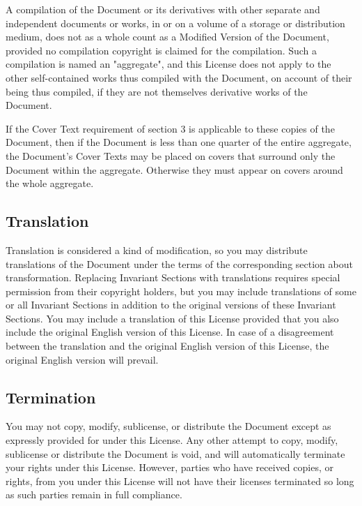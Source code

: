 	A compilation of the Document or its derivatives with other separate and independent documents or works, in or on a volume of a storage or distribution medium, does not as a whole count as a Modified Version of the Document, provided no compilation copyright is claimed for the compilation. Such a compilation is named an "aggregate", and this License does not apply to the other self-contained works thus compiled with the Document, on account of their being thus compiled, if they are not themselves derivative works of the Document. 

	If the Cover Text requirement of section 3 is applicable to these copies of the Document, then if the Document is less than one quarter of the entire aggregate, the Document's Cover Texts may be placed on covers that surround only the Document within the aggregate. Otherwise they must appear on covers around the whole aggregate. 

	\subsection{Translation}

Translation is considered a kind of modification, so you may distribute translations of the Document under the terms of the corresponding section about transformation. Replacing Invariant Sections with translations requires special permission from their copyright holders, but you may include translations of some or all Invariant Sections in addition to the original versions of these Invariant Sections. You may include a translation of this License provided that you also include the original English version of this License. In case of a disagreement between the translation and the original English version of this License, the original English version will prevail. 

	\subsection{Termination}

	You may not copy, modify, sublicense, or distribute the Document except as expressly provided for under this License. Any other attempt to copy, modify, sublicense or distribute the Document is void, and will automatically terminate your rights under this License. However, parties who have received copies, or rights, from you under this License will not have their licenses terminated so long as such parties remain in full compliance. 

